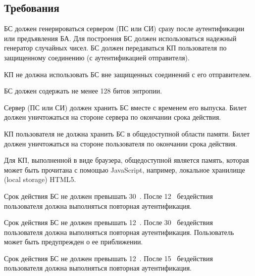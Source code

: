 \subsection{Требования}\label{SM.Reqs}

БС должен генерироваться сервером (ПС или СИ) сразу после аутентификации или 
предъявления БА. Для построения БС должен использоваться надежный генератор 
случайных чисел. БС должен передаваться КП пользователя по защищенному соединению
(с аутентификацией отправителя). 

КП не должна использовать БС вне защищенных соединений с его отправителем. 

БС должен содержать не менее 128 битов энтропии.


Сервер (ПС или СИ) должен хранить БС вместе с временем его выпуска.
Билет должен уничтожаться на стороне сервера по окончании срока действия.

КП пользователя не должна хранить БС в общедоступной области памяти.
Билет должен уничтожаться на стороне пользователя по окончании срока действия.

\begin{note*}
Для КП, выполненной в виде браузера, общедоступной является память,
которая может быть прочитана с помощью JavaScript, например,
локальное хранилище (local storage) HTML5.
%
\end{note*}

Срок действия БС не должен превышать 30~.
После 12~ бездействия пользователя 
должна выполняться повторная аутентификация.

Срок действия БС не должен превышать 12~.
После 30~ бездействия пользователя 
должна выполняться повторная аутентификация.
Пользователь может быть предупрежден о ее приближении.


Срок действия БС не должен превышать 12~.
После 15~ бездействия пользователя 
должна выполняться повторная аутентификация.


%
